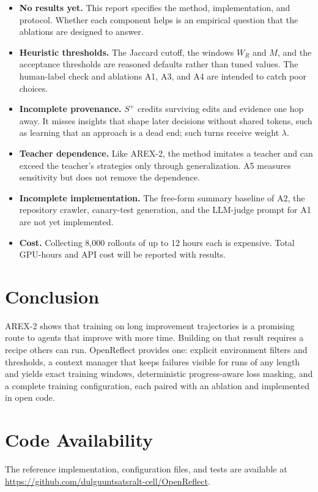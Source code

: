 \documentclass[11pt]{article}
\newcommand{\splus}{S^{+}}
\begin{document}
\begin{itemize}
  \item \textbf{No results yet.} This report specifies the method, implementation, and protocol. Whether each component helps is an empirical question that the ablations are designed to answer.
  \item \textbf{Heuristic thresholds.} The Jaccard cutoff, the windows $W_R$ and $M$, and the acceptance thresholds are reasoned defaults rather than tuned values. The human-label check and ablations A1, A3, and A4 are intended to catch poor choices.
  \item \textbf{Incomplete provenance.} $\splus$ credits surviving edits and evidence one hop away. It misses insights that shape later decisions without shared tokens, such as learning that an approach is a dead end; such turns receive weight $\lambda$.
  \item \textbf{Teacher dependence.} Like AREX-2, the method imitates a teacher and can exceed the teacher's strategies only through generalization. A5 measures sensitivity but does not remove the dependence.
  \item \textbf{Incomplete implementation.} The free-form summary baseline of A2, the repository crawler, canary-test generation, and the LLM-judge prompt for A1 are not yet implemented.
  \item \textbf{Cost.} Collecting 8{,}000 rollouts of up to 12 hours each is expensive. Total GPU-hours and API cost will be reported with results.
\end{itemize}

\section{Conclusion}

AREX-2 shows that training on long improvement trajectories is a promising route to agents that improve with more time. Building on that result requires a recipe others can run. OpenReflect provides one: explicit environment filters and thresholds, a context manager that keeps failures visible for runs of any length and yields exact training windows, deterministic progress-aware loss masking, and a complete training configuration, each paired with an ablation and implemented in open code.

\section*{Code Availability}
The reference implementation, configuration files, and tests are available at \url{https://github.com/dulguuntsatsralt-cell/OpenReflect}.
\end{document}
